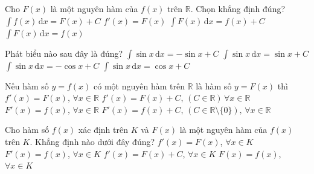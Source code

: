 

\begin{ex}%
	Cho $F(x)$  là một nguyên hàm của $f(x)$ trên $\mathbb{R}$. Chọn khẳng định đúng?
	\choice 
		{\True $\displaystyle\int  f(x) \mathrm{\,d}x=F(x)+C$}
		 {$f'(x)=F(x)$}
		{$\displaystyle\int  F(x) \mathrm{\,d}x=f(x)+C$}
		{$\displaystyle\int F(x) \mathrm{\,d}x=f(x)$} 
\end{ex}

\begin{ex}%
	Phát biểu nào sau đây là đúng? 
	 \choice
		{$\displaystyle\int \sin x\mathrm{\,d}x = -\sin  x+ C$}
		{$\displaystyle\int \sin x\mathrm{\,d}x =  \sin x+ C$}
		{\True $\displaystyle\int \sin x\mathrm{\,d}x = -\cos  x+ C$}
		{$\displaystyle\int \sin x\mathrm{\,d}x = \cos{x}+  C$}
\end{ex}

\begin{ex}%
	Nếu hàm số $y=f(x)$ có một nguyên hàm trên $\mathbb{R}$ là hàm  số $y=F(x)$ thì
	\choice 
		 {$f'(x)=F(x),\, \forall x\in \mathbb{R}$}
		{$f'(x)=F(x)+C,\, (C\in \mathbb{R}) \, \forall x\in \mathbb{R}$} 
		{\True $F'(x)=f(x), \, \forall  x\in \mathbb{R}$}
		{$F'(x)=f(x)+C,\,(C \in \mathbb{R}\setminus \{0\}),\,\forall x\in  \mathbb{R}$}
\end{ex}

\begin{ex}%
	Cho hàm số $f(x)$ xác định trên $K$  và $F(x)$ là một nguyên hàm của $f(x)$ trên $K$. Khẳng định nào dưới đây đúng?
	\choice 
		{$f'(x)=F(x)$, $\forall x\in  K$}
		{\True $F'(x)=f(x)$, $\forall  x\in K$}
		 {$f'(x)=F(x)+C$, $\forall x\in K$}
		{$F(x)=f(x)$, $\forall x\in K$} 
\end{ex}

